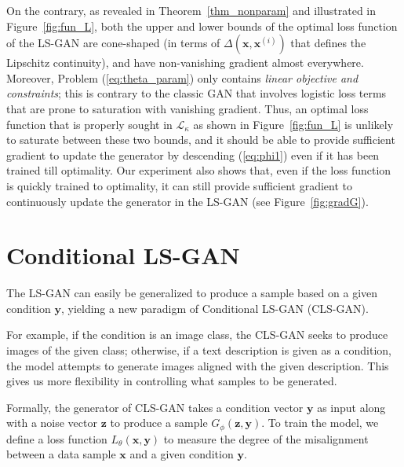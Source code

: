 On the contrary, as revealed in Theorem~\ref{thm_nonparam} and illustrated in Figure~\ref{fig:fun_L}, both the upper and lower bounds of the optimal loss function of the LS-GAN are cone-shaped (in terms of $\Delta(\mathbf x, \mathbf x^{(i)})$ that defines the Lipschitz continuity), and have non-vanishing gradient almost everywhere. Moreover, Problem (\ref{eq:theta_param}) only contains {\em linear objective and constraints}; this is contrary to the classic GAN that involves logistic loss terms that are prone to saturation with vanishing gradient. Thus, an optimal loss function that is properly sought in $\mathcal L_\kappa$ as shown in Figure~\ref{fig:fun_L} is unlikely to saturate between these two bounds, and it should be able to provide sufficient gradient to update the generator by descending (\ref{eq:phi1}) even if it has been trained till optimality. Our experiment also shows that, even if the loss function is quickly trained to optimality, it can still provide sufficient gradient to continuously update the generator in the LS-GAN (see Figure~\ref{fig:gradG}).


\section{Conditional LS-GAN}\label{sec:clsgan}
The LS-GAN can easily be generalized to produce a sample based on a given condition $\mathbf y$, yielding a new paradigm of Conditional LS-GAN (CLS-GAN).

For example, if the condition is an image class, the CLS-GAN seeks to produce images of the given class; otherwise, if a text description is given as a condition, the model attempts to generate images aligned with the given description.  This gives us more flexibility in controlling what samples to be generated.

Formally, the generator of CLS-GAN takes a condition vector $\mathbf y$ as input along with a noise vector $\mathbf z$ to produce a sample $G_\phi(\mathbf z, \mathbf y)$.
To train the model, we define a loss function $L_\theta(\mathbf x, \mathbf y)$ to measure the degree of the misalignment between a data sample $\mathbf x$ and a given condition $\mathbf y$.

